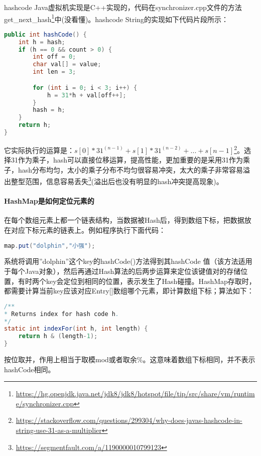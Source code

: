 \documentclass[../../../interview-questions.tex]{subfiles}
\begin{document}
hashcode Java虚拟机实现是C++实现的，代码在synchronizer.cpp文件的方法get\_next\_hash\footnote{\url{https://hg.openjdk.java.net/jdk8/jdk8/hotspot/file/tip/src/share/vm/runtime/synchronizer.cpp}}中(没看懂)。hashcode String的实现如下代码片段所示：

\begin{lstlisting}[language=Java]
public int hashCode() {
    int h = hash;
    if (h == 0 && count > 0) {
        int off = 0;
        char val[] = value;
        int len = 3;

        for (int i = 0; i < 3; i++) {
            h = 31*h + val[off++];
        }
        hash = h;
    }
    return h;
}
\end{lstlisting}



它实际执行的运算是：$s[0]*31^{(n-1)} + s[1]*31^{(n-2)} + ... + s[n-1]$\footnote{\url{https://stackoverflow.com/questions/299304/why-does-javas-hashcode-in-string-use-31-as-a-multiplier}}。选择31作为乘子，hash可以直接位移运算，提高性能，更加重要的是采用31作为乘子，hash分布均匀，太小的乘子分布不均匀很容易冲突，太大的乘子非常容易溢出整型范围，信息容易丢失\footnote{\url{https://segmentfault.com/a/1190000010799123}}(溢出后也没有明显的hash冲突提高现象)。

\paragraph{HashMap是如何定位元素的}

在每个数组元素上都一个链表结构，当数据被Hash后，得到数组下标，把数据放在对应下标元素的链表上。例如程序执行下面代码：

\begin{lstlisting}[language=Java]
map.put("dolphin","小强");
\end{lstlisting}

系统将调用”dolphin”这个key的hashCode()方法得到其hashCode 值（该方法适用于每个Java对象），然后再通过Hash算法的后两步运算来定位该键值对的存储位置，有时两个key会定位到相同的位置，表示发生了Hash碰撞。HashMap存取时，都需要计算当前key应该对应Entry[]数组哪个元素，即计算数组下标；算法如下：

\begin{lstlisting}[language=Java]
/**
* Returns index for hash code h.
*/
static int indexFor(int h, int length) {
	return h & (length-1);
}
\end{lstlisting}

按位取并，作用上相当于取模mod或者取余\%。这意味着数组下标相同，并不表示hashCode相同。
\end{document}
